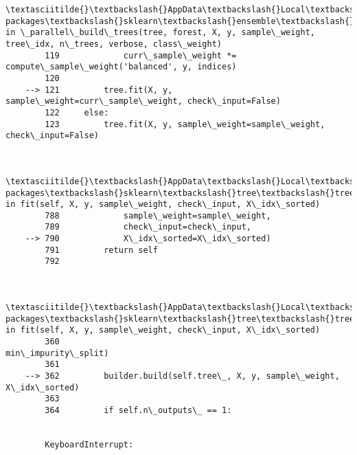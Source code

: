 \documentclass[11pt]{article}
\begin{document}
\begin{Verbatim}[commandchars=\\\{\}]
        \textasciitilde{}\textbackslash{}AppData\textbackslash{}Local\textbackslash{}Continuum\textbackslash{}anaconda3\textbackslash{}lib\textbackslash{}site-packages\textbackslash{}sklearn\textbackslash{}ensemble\textbackslash{}forest.py in \_parallel\_build\_trees(tree, forest, X, y, sample\_weight, tree\_idx, n\_trees, verbose, class\_weight)
        119             curr\_sample\_weight *= compute\_sample\_weight('balanced', y, indices)
        120 
    --> 121         tree.fit(X, y, sample\_weight=curr\_sample\_weight, check\_input=False)
        122     else:
        123         tree.fit(X, y, sample\_weight=sample\_weight, check\_input=False)
    

        \textasciitilde{}\textbackslash{}AppData\textbackslash{}Local\textbackslash{}Continuum\textbackslash{}anaconda3\textbackslash{}lib\textbackslash{}site-packages\textbackslash{}sklearn\textbackslash{}tree\textbackslash{}tree.py in fit(self, X, y, sample\_weight, check\_input, X\_idx\_sorted)
        788             sample\_weight=sample\_weight,
        789             check\_input=check\_input,
    --> 790             X\_idx\_sorted=X\_idx\_sorted)
        791         return self
        792 
    

        \textasciitilde{}\textbackslash{}AppData\textbackslash{}Local\textbackslash{}Continuum\textbackslash{}anaconda3\textbackslash{}lib\textbackslash{}site-packages\textbackslash{}sklearn\textbackslash{}tree\textbackslash{}tree.py in fit(self, X, y, sample\_weight, check\_input, X\_idx\_sorted)
        360                                            min\_impurity\_split)
        361 
    --> 362         builder.build(self.tree\_, X, y, sample\_weight, X\_idx\_sorted)
        363 
        364         if self.n\_outputs\_ == 1:
    

        KeyboardInterrupt: 

    \end{Verbatim}


    
    
    
    
\end{document}
